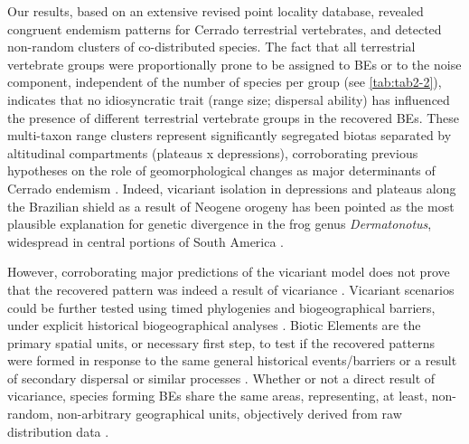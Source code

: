 \documentclass[12pt,openright,oneside,a4paper,english]{abntex2}
\begin{document}
Our results, based on an extensive revised point locality database, revealed congruent endemism patterns for Cerrado terrestrial vertebrates, and detected non-random clusters of co-distributed species. The fact that all terrestrial vertebrate groups were proportionally prone to be assigned to BEs or to the noise component, independent of the number of species per group (see \autoref{tab:tab2-2}), indicates that no idiosyncratic trait (range size; dispersal ability) has influenced the presence of different terrestrial vertebrate groups in the recovered BEs. These multi-taxon range clusters represent significantly segregated biotas separated by altitudinal compartments (plateaus x depressions), corroborating previous hypotheses on the role of geomorphological changes as major determinants of Cerrado endemism \citep{Silva1997, BrownGiff2002, Nogueira2011}. Indeed, vicariant isolation in depressions and plateaus along the Brazilian shield as a result of Neogene orogeny has been pointed as the most plausible explanation for genetic divergence in the frog genus \textit{Dermatonotus}, widespread in central portions of South America \citep{Oliveira2018}.

However, corroborating major predictions of the vicariant model does not prove that the recovered pattern was indeed a result of vicariance \citep{Hausdorf2002}. Vicariant scenarios could be further tested using timed phylogenies and biogeographical barriers, under explicit historical biogeographical analyses \citep{Hausdorf2002, Hennig2004}. Biotic Elements are the primary spatial units, or necessary first step, to test if the recovered patterns were formed in response to the same general historical events/barriers or a result of secondary dispersal or similar processes \citep{Hausdorf2002}. Whether or not a direct result of vicariance, species forming BEs share the same areas, representing, at least, non-random, non-arbitrary geographical units, objectively derived from raw distribution data \citep{Hausdorf2002}.
\end{document}

